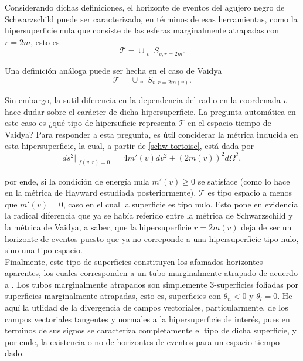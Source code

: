 \documentclass[16pt,a4paper]{article}
\numberwithin{equation}{section}
\theoremstyle{definition}
\begin{document}
Considerando dichas definiciones, el horizonte de eventos del agujero negro de Schwarzschild puede ser caracterizado, en términos de esas herramientas, como la hipersuperficie nula que consiste de las esferas marginalmente atrapadas con $r = 2m$, esto es
\begin{equation*}
\mathcal{T} = \cup_{\substack{v}}S_{v,r = 2m}.
\end{equation*}

Una definición análoga puede ser hecha en el caso de Vaidya  
\begin{equation*}
\mathcal{T} = \cup_{\substack{v}}S_{v,r = 2m(v)}.
\end{equation*}

Sin embargo, la sutil diferencia en la dependencia del radio en la coordenada $v$ hace dudar sobre el carácter de dicha hipersuperficie. La pregunta automática en este caso es ¿qué tipo de hipersuficie representa $\mathcal{T}$ en el espacio-tiempo de Vaidya? Para responder a esta pregunta, es útil conciderar la métrica inducida en esta hipersuperficie, la cual, a partir de \eqref{schw-tortoise}, está dada por\\
\begin{equation}
\label{ind vaiya}
ds^2|_{\substack{f(v,r)=0}} = 4m'(v)dv^2 + (2m(v))^2d\Omega^2,
\end{equation}

por ende, si la condición de energía nula $m'(v) \geq 0$ se satisface (como lo hace en la métrica de Hayward estudiada posteriormente), $\mathcal{T}$ es tipo espacio a menos que $m'(v) = 0$, caso en el cual la superficie es tipo nulo. Esto pone en evidencia la radical diferencia que ya se había referido entre la métrica de Schwarzschild y la métrica de Vaidya, a saber, que la hipersuperficie $r = 2m(v)$ deja de ser un horizonte de eventos puesto que ya no correponde a una hipersuperficie tipo nulo, sino una tipo espacio.\\

Finalmente, este tipo de superficies constituyen los afamados horizontes aparentes, los cuales corresponden a un tubo marginalmente atrapado de acuerdo a \cite{blau}. Los tubos marginalmente atrapados son simplemente 3-superficies foliadas por superficies marginalmente atrapadas, esto es, superficies con $\theta_n <0$ y $\theta_l = 0$. He aquí la utlidad de la divergencia de campos vectoriales, particularmente, de los campos vectoriales tangentes y normales a la hipersuperficie de interés, pues en terminos de sus signos se caracteriza completamente el tipo de dicha superficie, y por ende, la existencia o no de horizontes de eventos para un espacio-tiempo dado.
\end{document}
